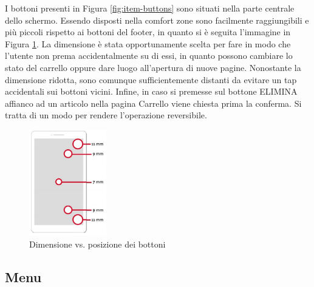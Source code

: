 \documentclass[12pt, a4paper, titlepage]{report}
\begin{document}
	\noindent I bottoni presenti in Figura \ref{fig:item-buttons} sono situati nella parte centrale dello schermo. Essendo disposti nella comfort zone sono facilmente raggiungibili e più piccoli rispetto ai bottoni del footer, in quanto si è seguita l'immagine in Figura \ref{fig:dimvspos}. La dimensione è stata opportunamente scelta per fare in modo che l'utente non prema accidentalmente su di essi, in quanto possono cambiare lo stato del carrello oppure dare luogo all'apertura di nuove pagine. Nonostante la dimensione ridotta, sono comunque sufficientemente distanti da evitare un tap accidentali sui bottoni vicini. Infine, in caso si premesse sul bottone ELIMINA affianco ad un articolo nella pagina Carrello viene chiesta prima la conferma. Si tratta di un modo per rendere l'operazione reversibile.
	\begin{figure}[H] 
		\centering
		\includegraphics[width=0.3\textwidth]{img/dimvspos}
		\caption{Dimensione vs. posizione dei bottoni}
		\label{fig:dimvspos}
	\end{figure}
	
	\subsection{Menu}
	
\end{document}
